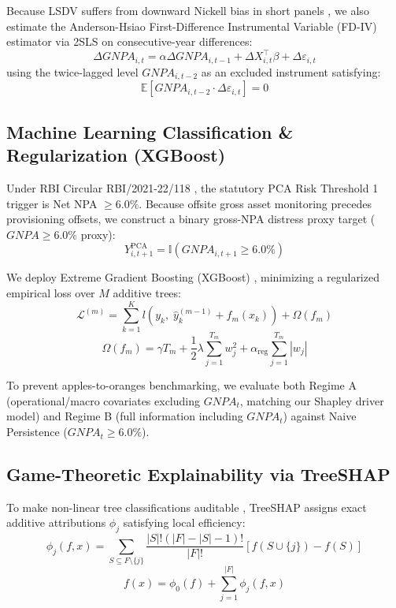 \documentclass[conference]{IEEEtran}
\begin{document}
Because LSDV suffers from downward Nickell bias in short panels \cite{arellano1991}, we also estimate the Anderson-Hsiao First-Difference Instrumental Variable (FD-IV) estimator via 2SLS on consecutive-year differences:
\begin{equation}
\Delta GNPA_{i,t} = \alpha \Delta GNPA_{i,t-1} + \Delta X_{i,t}^\top \beta + \Delta \varepsilon_{i,t}
\end{equation}
using the twice-lagged level $GNPA_{i,t-2}$ as an excluded instrument satisfying:
\begin{equation}
\mathbb{E}[ GNPA_{i,t-2} \cdot \Delta \varepsilon_{i,t} ] = 0
\end{equation}

\subsection{Machine Learning Classification \& Regularization (XGBoost)}
Under RBI Circular RBI/2021-22/118 \cite{rbi_pca2021}, the statutory PCA Risk Threshold 1 trigger is Net NPA $\ge 6.0\%$. Because offsite gross asset monitoring precedes provisioning offsets, we construct a binary gross-NPA distress proxy target ($GNPA \ge 6.0\%$ proxy):
\begin{equation}
Y_{i,t+1}^{\text{PCA}} = \mathbb{I}( GNPA_{i,t+1} \ge 6.0\% )
\end{equation}

We deploy Extreme Gradient Boosting (XGBoost) \cite{chen2016}, minimizing a regularized empirical loss over $M$ additive trees:
\begin{equation}
\mathcal{L}^{(m)} = \sum_{k=1}^K l\left( y_k, \; \hat{y}_k^{(m-1)} + f_m(x_k) \right) + \Omega(f_m)
\end{equation}
\begin{equation}
\Omega(f_m) = \gamma T_m + \frac{1}{2} \lambda \sum_{j=1}^{T_m} w_j^2 + \alpha_{\text{reg}} \sum_{j=1}^{T_m} |w_j|
\end{equation}

To prevent apples-to-oranges benchmarking, we evaluate both Regime A (operational/macro covariates excluding $GNPA_t$, matching our Shapley driver model) and Regime B (full information including $GNPA_t$) against Naive Persistence ($GNPA_t \ge 6.0\%$).

\subsection{Game-Theoretic Explainability via TreeSHAP}
To make non-linear tree classifications auditable \cite{lundberg2017, lundberg2020}, TreeSHAP assigns exact additive attributions $\phi_j$ satisfying local efficiency:
\begin{equation}
\phi_j(f, x) = \sum_{S \subseteq F \setminus \{j\}} \frac{|S|!(|F| - |S| - 1)!}{|F|!} [ f(S \cup \{j\}) - f(S) ]
\end{equation}
\begin{equation}
f(x) = \phi_0(f) + \sum_{j=1}^{|F|} \phi_j(f, x)
\end{equation}
\end{document}
